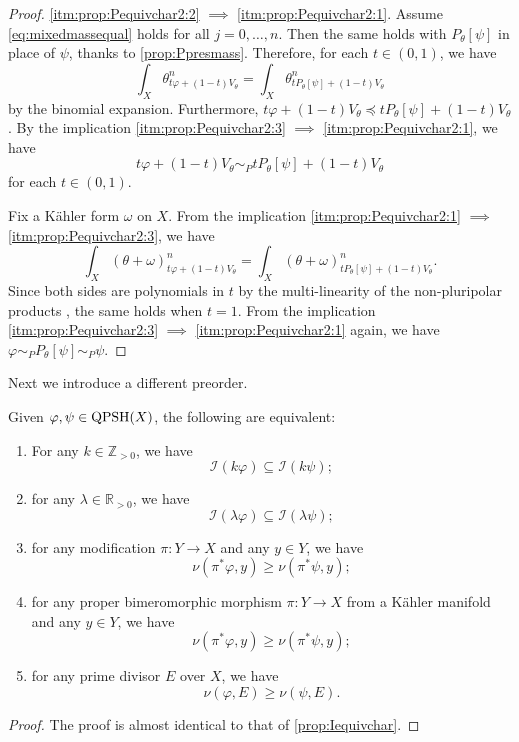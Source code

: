 \begin{proof}
    \ref{itm:prop:Pequivchar2:2} $\implies$ \ref{itm:prop:Pequivchar2:1}. Assume \eqref{eq:mixedmassequal} holds for all $j=0,\ldots,n$. Then the same holds with $P_{\theta}[\psi]$ in place of $\psi$, thanks to \cref{prop:Ppresmass}.
    Therefore, for each $t\in (0,1)$, we have
    \[
        \int_X \theta_{t\varphi+(1-t)V_{\theta}}^n=  \int_X \theta_{tP_{\theta}[\psi]+(1-t)V_{\theta}}^n
    \]
    by the binomial expansion. Furthermore, $t\varphi+(1-t)V_{\theta}\preceq tP_{\theta}[\psi]+(1-t)V_{\theta}$.
    By the implication \ref{itm:prop:Pequivchar2:3} $\implies$ \ref{itm:prop:Pequivchar2:1}, we have
    \[
        t\varphi+(1-t)V_{\theta}\sim_P t P_{\theta}[\psi]+(1-t)V_{\theta}
    \]
    for each $t\in (0,1)$.

    Fix a Kähler form $\omega$ on $X$.
    From the implication \ref{itm:prop:Pequivchar2:1} $\implies$ \ref{itm:prop:Pequivchar2:3}, we have
    \[
        \int_X (\theta+\omega)_{t\varphi+(1-t)V_{\theta}}^n=  \int_X (\theta+\omega)_{tP_{\theta}[\psi]+(1-t)V_{\theta}}^n.
    \]
    Since both sides are polynomials in $t$ by the multi-linearity of the non-pluripolar products , the same holds when $t=1$. From the implication \ref{itm:prop:Pequivchar2:3} $\implies$ \ref{itm:prop:Pequivchar2:1} again, we have $\varphi\sim_P P_{\theta}[\psi]\sim_P \psi$.
\end{proof}



Next we introduce a different preorder.
\begin{proposition}\label{prop:Iequivchar2}
    Given $\varphi,\psi\in \mathrm{QPSH}(X)$, the following are equivalent:
    \begin{enumerate}
        \item\label{itm:prop:Iequivchar2:1} For any $k\in \mathbb{Z}_{>0}$, we have
        \[
            \mathcal{I}(k\varphi)\subseteq\mathcal{I}(k\psi);
        \]
        \item\label{itm:prop:Iequivchar2:2} for any $\lambda\in \mathbb{R}_{>0}$, we have
            \[
            \mathcal{I}(\lambda\varphi)\subseteq\mathcal{I}(\lambda\psi);
            \]
        \item\label{itm:prop:Iequivchar2:3} for any modification $\pi\colon Y\rightarrow X$ and any $y\in Y$, we have
            \[
                \nu(\pi^*\varphi,y)\geq \nu(\pi^*\psi,y);
            \]
        \item\label{itm:prop:Iequivchar2:4} for any proper bimeromorphic morphism $\pi\colon Y\rightarrow X$ from a Kähler manifold and any $y\in Y$, we have
            \[
                \nu(\pi^*\varphi,y)\geq \nu(\pi^*\psi,y);
            \]
        \item\label{itm:prop:Iequivchar2:5} for any prime divisor $E$ over $X$, we have
            \[
                \nu(\varphi,E)\geq \nu(\psi,E).
            \]
    \end{enumerate}
\end{proposition}
\begin{proof}
    The proof is almost identical to that of \cref{prop:Iequivchar}.
\end{proof}

